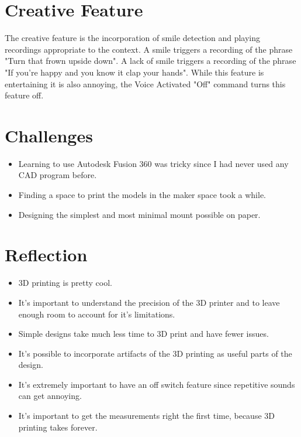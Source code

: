 \documentclass{article}
\begin{document}
	
	\clearpage
	\section{Creative Feature}
	
	The creative feature is the incorporation of smile detection and playing recordings appropriate to the context.
	A smile triggers a recording of the phrase "Turn that frown upside down".
	A lack of smile triggers a recording of the phrase "If you're happy and you know it clap your hands".
 	While this feature is entertaining it is also annoying, the Voice Activated "Off" command turns this feature off.
	
	
	\section{Challenges}
	\begin{itemize}
		\item Learning to use Autodesk Fusion 360 was tricky since I had never used any CAD program before.
		\item Finding a space to print the models in the maker space took a while.
		\item Designing the simplest and most minimal mount possible on paper.
	\end{itemize}
	
	
	\section{Reflection}
	\begin{itemize}
		\item 3D printing is pretty cool.
		\item It's important to understand the precision of the 3D printer and to leave enough room to account for it's limitations.
		\item Simple designs take much less time to 3D print and have fewer issues.
		\item It's possible to incorporate artifacts of the 3D printing as useful parts of the design.
		\item It's extremely important to have an off switch feature since repetitive sounds can get annoying.
		\item It's important to get the measurements right the first time, because 3D printing takes forever.
	\end{itemize}
	
\end{document}
